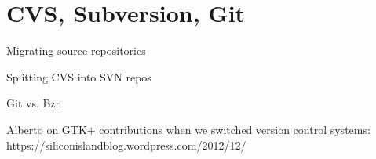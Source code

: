\chapter{CVS, Subversion, Git}

Migrating source repositories

Splitting CVS into SVN repos

Git vs. Bzr

Alberto on GTK+ contributions when we switched version control
systems: https://siliconislandblog.wordpress.com/2012/12/
